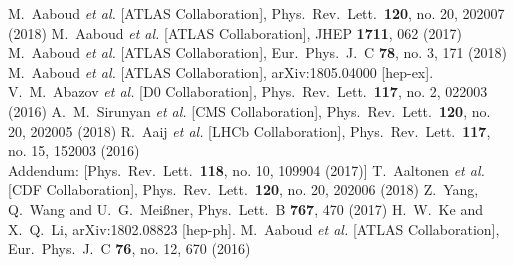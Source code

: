 \documentclass[epj]{webofc}
\begin{document}
\begin{acknowledgement}

\end{acknowledgement}
%
% 
%
%
\begin{thebibliography}{00}
%
%
  M.~Aaboud {\it et al.} [ATLAS Collaboration],
  Phys.\ Rev.\ Lett.\  {\bf 120}, no. 20, 202007 (2018)
  M.~Aaboud {\it et al.} [ATLAS Collaboration],
  JHEP {\bf 1711}, 062 (2017)
  M.~Aaboud {\it et al.} [ATLAS Collaboration],
  Eur.\ Phys.\ J.\ C {\bf 78}, no. 3, 171 (2018)
  M.~Aaboud {\it et al.} [ATLAS Collaboration],
  arXiv:1805.04000 [hep-ex].
  V.~M.~Abazov {\it et al.} [D0 Collaboration],
  Phys.\ Rev.\ Lett.\  {\bf 117}, no. 2, 022003 (2016)
  A.~M.~Sirunyan {\it et al.} [CMS Collaboration],
  Phys.\ Rev.\ Lett.\  {\bf 120}, no. 20, 202005 (2018)
  R.~Aaij {\it et al.} [LHCb Collaboration],
  Phys.\ Rev.\ Lett.\  {\bf 117}, no. 15, 152003 (2016)\\
  Addendum: [Phys.\ Rev.\ Lett.\  {\bf 118}, no. 10, 109904 (2017)]
  T.~Aaltonen {\it et al.} [CDF Collaboration],
  Phys.\ Rev.\ Lett.\  {\bf 120}, no. 20, 202006 (2018)
  Z.~Yang, Q.~Wang and U.~G.~Meißner,
  Phys.\ Lett.\ B {\bf 767}, 470 (2017)
  H.~W.~Ke and X.~Q.~Li,
  arXiv:1802.08823 [hep-ph].
  M.~Aaboud {\it et al.} [ATLAS Collaboration],
  Eur.\ Phys.\ J.\ C {\bf 76}, no. 12, 670 (2016)
\end{thebibliography}
\end{document}
